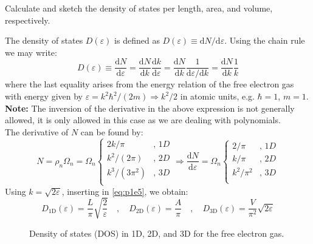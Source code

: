 \begin{exercise}
Calculate and sketch the density of states per length, area, and volume, respectively.
\end{exercise}
\begin{solution}
The density of states $D(\varepsilon)$ is defined as $D(\varepsilon) \equiv \mathrm{d}N/\mathrm{d}\varepsilon$. Using the chain rule we may write:
\begin{equation}
	 D(\varepsilon) \equiv \dfrac{\mathrm{d}N}{\mathrm{d}\varepsilon} = \dfrac{\mathrm{d}N}{\mathrm{d}k}\dfrac{\mathrm{d}k}{\mathrm{d}\varepsilon} = \dfrac{\mathrm{d}N}{\mathrm{d}k} \dfrac{1}{\mathrm{d}\varepsilon/\mathrm{d}k} = \dfrac{\mathrm{d}N}{\mathrm{d}k} \dfrac{1}{k}
\end{equation}
where the last equality arises from the energy relation of the free electron gas with energy given by $\varepsilon = k^2\hbar^2/(2m) \Rightarrow k^2/2$ in atomic units, e.g. $\hbar = 1$, $m = 1$. \textbf{Note:} The inversion of the derivative in the above expression is not generally allowed, it is only allowed in this case as we are dealing with polynomials. \\
The derivative of $N$ can be found by:
\begin{equation}\label{eq:p1e5}
    N = \rho_n \Omega_n = \Omega_n\begin{cases}
        2k/\pi & ,\,1D \\
        k^2/(2\pi) & ,\,2D \\
        k^3/(3\pi^2) & ,\,3D \\
    \end{cases} \Rightarrow \dfrac{\mathrm{d}N}{\mathrm{d}\varepsilon} = \Omega_n \begin{cases}
        2/\pi & ,\,1D \\
        k/\pi & ,\,2D \\
        k^2/\pi^2 & ,\,3D \\
    \end{cases}
\end{equation}
Using $k = \sqrt{2\varepsilon}$, inserting in \eqref{eq:p1e5}, we obtain:
\begin{equation}
    D_{1\mathrm{D}}(\varepsilon) = \dfrac{L}{\pi}\sqrt{\dfrac{2}{\varepsilon}} \quad,\quad D_{2\mathrm{D}}(\varepsilon) = \dfrac{A}{\pi}\quad,\quad 
    D_{3\mathrm{D}}(\varepsilon) = \dfrac{V}{\pi^2}\sqrt{2\varepsilon}
\end{equation}
\begin{figure}
    \centering
    
    \label{fig:p1f1}
    \caption{Density of states (DOS) in 1D, 2D, and 3D for the free electron gas.}
\end{figure}
\end{solution}

